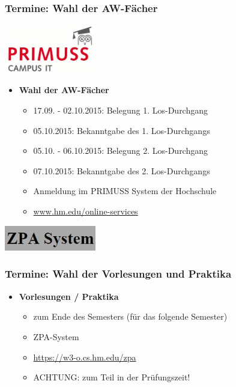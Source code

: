 \documentclass{beamer}
\begin{document}
    \begin{frame}[t]
    	\frametitle{Termine: Wahl der AW-Fächer}
    	\flushright
    	\includegraphics[width=0.3\textwidth]{primuss.jpg}
    	\begin{itemize}
    		\item \textbf{Wahl der AW-Fächer}
    		    \begin{itemize}
    		    	\item 17.09. - 02.10.2015: Belegung 1. Los-Durchgang
    		    	\item 05.10.2015: Bekanntgabe des 1. Los-Durchgangs
    		    	\item 05.10. - 06.10.2015: Belegung 2. Los-Durchgang
    		    	\item 07.10.2015: Bekanntgabe des 2. Los-Durchgangs
    		    	\bigskip
    		    	\item Anmeldung im PRIMUSS System der Hochschule
    		    	\item \url{www.hm.edu/online-services}
    		    \end{itemize}
    	\end{itemize}
    \end{frame}

    \begin{frame}
    	\flushright
    	\includegraphics[width=0.3\textwidth]{zpa.jpg}
    	\frametitle{Termine: Wahl der Vorlesungen und Praktika}
    	\begin{itemize}
    		\item \textbf{Vorlesungen / Praktika}
    		\begin{itemize}
    			\item zum Ende des Semesters (für das folgende Semester)
    			\item ZPA-System
    			\item \url{https://w3-o.cs.hm.edu/zpa}
    			\item ACHTUNG: zum Teil in der Prüfungszeit!
    		\end{itemize}
    	\end{itemize}
    \end{frame}
\end{document}

